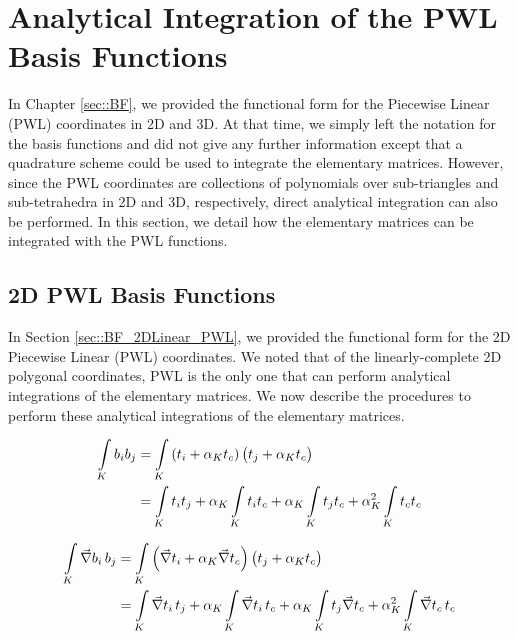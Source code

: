 \section{Analytical Integration of the PWL Basis Functions}
\label{sec::appendix_BF_PWLInt}

In Chapter \ref{sec::BF}, we provided the functional form for the Piecewise Linear (PWL) coordinates in 2D and 3D. At that time, we simply left the notation for the basis functions and did not give any further information except that a quadrature scheme could be used to integrate the elementary matrices. However, since the PWL coordinates are collections of polynomials over sub-triangles and sub-tetrahedra in 2D and 3D, respectively, direct analytical integration can also be performed. In this section, we detail how the elementary matrices can be integrated with the PWL functions.

\subsection{2D PWL Basis Functions}
\label{sec::appendix_BF_PWLInt_2D}

In Section \ref{sec::BF_2DLinear_PWL}, we provided the functional form for the 2D Piecewise Linear (PWL) coordinates. We noted that of the linearly-complete 2D polygonal coordinates, PWL is the only one that can perform analytical integrations of the elementary matrices. We now describe the procedures to perform these analytical integrations of the elementary matrices.

\begin{equation}
\label{eq::App_BF_2D_triref_massterm}
\begin{aligned}
\int\displaylimits_K b_i b_j &= \int\displaylimits_K \left( t_i + \alpha_K t_c  \right) \left(  t_j + \alpha_K t_c \right) \\
&= \int\displaylimits_K t_i t_j + \alpha_K \int\displaylimits_K t_i t_c + \alpha_K \int\displaylimits_K t_j t_c + \alpha_K^2 \int\displaylimits_K t_c t_c
\end{aligned}
\end{equation}

\begin{equation}
\label{eq::App_BF_2D_triref_gradterm}
\begin{aligned}
\int\displaylimits_K \vec{\nabla} b_i \,  b_j &= \int\displaylimits_K \left( \vec{\nabla} t_i + \alpha_K \vec{\nabla} t_c  \right) \left(  t_j + \alpha_K t_c \right) \\
&= \int\displaylimits_K \vec{\nabla} t_i \,t_j + \alpha_K \int\displaylimits_K \vec{\nabla} t_i\, t_c + \alpha_K \int\displaylimits_K t_j \vec{\nabla} t_c + \alpha_K^2 \int\displaylimits_K \vec{\nabla} t_c \, t_c
\end{aligned}
\end{equation}


